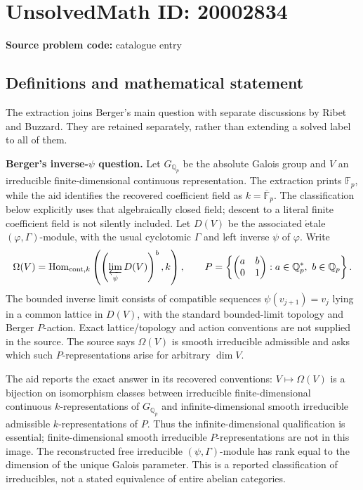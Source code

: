 \documentclass[11pt]{article}
\newcommand{\Q}{\mathbb{Q}}
\newcommand{\F}{\mathbb{F}}
\begin{document}
\section*{UnsolvedMath ID: 20002834}
\textbf{Source problem code:} catalogue entry
\subsection{Definitions and mathematical statement}
The extraction joins Berger's main question with separate discussions by Ribet and Buzzard. They are retained separately, rather than extending a solved label to all of them.

\textbf{Berger's inverse-\(\psi\) question.} Let \(G_{\Q_p}\) be the absolute Galois group and \(V\) an irreducible finite-dimensional continuous representation. The extraction prints \(\F_p\), while the aid identifies the recovered coefficient field as \(k=\overline{\F}_p\). The classification below explicitly uses that algebraically closed field; descent to a literal finite coefficient field is not silently included. Let \(D(V)\) be the associated \(\acute{\mathrm e}\)tale \((\varphi,\Gamma)\)-module, with the usual cyclotomic \(\Gamma\) and left inverse \(\psi\) of \(\varphi\). Write
\[
 \Omega(V)=\operatorname{Hom}_{\mathrm{cont},k}
       \left(\left(\varprojlim_\psi D(V)\right)^b,k\right),\qquad
 P=\left\{\begin{pmatrix}a&b\\0&1\end{pmatrix}:
                           a\in\Q_p^*,\ b\in\Q_p\right\}.
\]
The bounded inverse limit consists of compatible sequences \(\psi(v_{j+1})=v_j\) lying in a common lattice in \(D(V)\), with the standard bounded-limit topology and Berger \(P\)-action. Exact lattice/topology and action conventions are not supplied in the source. The source says \(\Omega(V)\) is smooth irreducible admissible and asks which such \(P\)-representations arise for arbitrary \(\dim V\).

The aid reports the exact answer in its recovered conventions: \(V\mapsto\Omega(V)\) is a bijection on isomorphism classes between irreducible finite-dimensional continuous \(k\)-representations of \(G_{\Q_p}\) and infinite-dimensional smooth irreducible admissible \(k\)-representations of \(P\). Thus the infinite-dimensional qualification is essential; finite-dimensional smooth irreducible \(P\)-representations are not in this image. The reconstructed free irreducible \((\psi,\Gamma)\)-module has rank equal to the dimension of the unique Galois parameter. This is a reported classification of irreducibles, not a stated equivalence of entire abelian categories.
\end{document}

